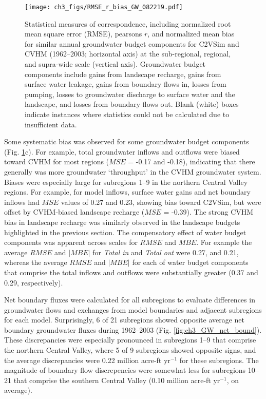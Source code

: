 \begin{figure}[ht!]
\centerline{\texttt{[image: ch3\_figs/RMSE\_r\_bias\_GW\_082219.pdf]}}
\caption{Statistical measures of correspondence, including normalized root mean square error (RMSE), pearsons $r$, and normalized mean bias for similar annual groundwater budget components for C2VSim and CVHM (1962--2003; horizontal axis) at the sub-regional, regional, and supra-wide scale (vertical axis). Groundwater budget components include gains from landscape recharge, gains from surface water leakage, gains from boundary flows in, losses from pumping, losses to groundwater discharge to surface water and the landscape, and losses from boundary flows out. Blank (white) boxes indicate instances where statistics could not be calculated due to insufficient data.}
\label{fig:ch3_GW_components}
\end{figure}

Some systematic bias was observed for some groundwater budget components (Fig. \ref{fig:ch3_GW_components}c). For example, total groundwater inflows and outflows were biased toward CVHM for most regions ($MSE$ = -0.17 and -0.18), indicating that there generally was more groundwater `throughput' in the CVHM groundwater system. Biases were especially large for subregions 1--9 in the northern Central Valley regions. For example, for model inflows, surface water gains and net boundary inflows had $MSE$ values of 0.27 and 0.23, showing bias toward C2VSim, but were offset by CVHM-biased landscape recharge ($MSE$ = -0.39). The strong CVHM bias in landscape recharge was similarly observed in the landscape budgets highlighted in the previous section. The compensatory effect of water budget components was apparent across scales for $RMSE$ and $MBE$. For example the average $RMSE$ and $|MBE|$ for \textit{Total in} and \textit{Total out} were 0.27, and 0.21, whereas the average $RMSE$ and $|MBE|$ for each of water budget components that comprise the total inflows and outflows were substantially greater (0.37 and 0.29, respectively).

Net boundary fluxes were calculated for all subregions to evaluate differences in groundwater flows and exchanges from model boundaries and adjacent subregions for each model. Surprisingly, 6 of 21 subregions showed opposite average net boundary groundwater fluxes during 1962--2003 (Fig. \ref{fig:ch3_GW_net_bound}). These discrepancies were especially pronounced in subregions 1--9 that comprise the northern Central Valley, where 5 of 9 subregions showed opposite signs, and the average discrepancies were 0.22 million acre-ft yr$^{-1}$ for these subregions. The magnitude of boundary flow discrepencies were somewhat less for subregions 10--21 that comprise the southern Central Valley (0.10 million acre-ft yr$^{-1}$, on average). 

